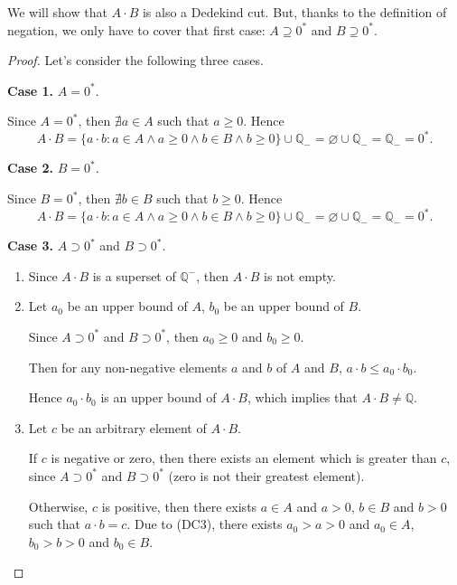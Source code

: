 \par We will show that $A\cdot B$ is also a Dedekind cut. But, thanks to the definition of negation, we only have to cover that first case: $A\supseteq{0}^{*}$ and $B\supseteq{0}^{*}$.

\begin{proof}
    \par Let's consider the following three cases.
    \par \textbf{Case 1.} $A = {0}^{*}$.
    \par Since $A = {0}^{*}$, then $\nexists a\in A$ such that $a\ge 0$. Hence
    \[
        A\cdot B = \{ a\cdot b: a\in A\land a\ge 0\land b\in B\land b\ge 0 \} \cup\mathbb{Q}_{-} = \varnothing\cup\mathbb{Q}_{-} = \mathbb{Q}_{-} = {0}^{*}.
    \]
    \par \textbf{Case 2.} $B = {0}^{*}$.
    \par Since $B = {0}^{*}$, then $\nexists b\in B$ such that $b\ge 0$. Hence
    \[
        A\cdot B = \{ a\cdot b: a\in A\land a\ge 0\land b\in B\land b\ge 0 \} \cup\mathbb{Q}_{-} = \varnothing\cup\mathbb{Q}_{-} = \mathbb{Q}_{-} = {0}^{*}.
    \]
    \par \textbf{Case 3.} $A\supset{0}^{*}$ and $B\supset{0}^{*}$.
    \begin{enumerate}[label = (\roman*)]
        \item Since $A\cdot B$ is a superset of $\mathbb{Q}^{-}$, then $A\cdot B$ is not empty.
        \item Let $a_{0}$ be an upper bound of $A$, $b_{0}$ be an upper bound of $B$.
              \par Since $A\supset{0}^{*}$ and $B\supset{0}^{*}$, then $a_{0}\ge 0$ and $b_{0}\ge 0$.
              \par Then for any non-negative elements $a$ and $b$ of $A$ and $B$, $a\cdot b \le a_{0}\cdot b_{0}$.
              \par Hence $a_{0}\cdot b_{0}$ is an upper bound of $A\cdot B$, which implies that $A\cdot B\ne\mathbb{Q}$.
        \item Let $c$ be an arbitrary element of $A\cdot B$.
              \par If $c$ is negative or zero, then there exists an element which is greater than $c$, since $A\supset {0}^{*}$ and $B\supset {0}^{*}$ (zero is not their greatest element).
              \par Otherwise, $c$ is positive, then there exists $a\in A$ and $a > 0$, $b\in B$ and $b > 0$ such that $a\cdot b = c$. Due to (DC3), there exists $a_{0} > a > 0$ and $a_{0}\in A$, $b_{0} > b > 0$ and $b_{0}\in B$.

\end{enumerate}
\end{proof}
